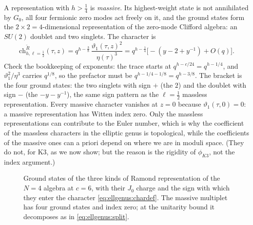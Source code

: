 A representation with $h>\tfrac14$ is \emph{massive}. Its highest-weight state is not
annihilated by $G_0$, all four fermionic zero modes act freely on it, and the ground states
form the $2\times2=4$-dimensional representation of the zero-mode Clifford algebra: an
$SU(2)$ doublet and two singlets. The character is 
\begin{equation}\label{eq:ellgenus:chmassive}
 \mathrm{ch}^{\tilde R}_{h,\ell=\frac12}(\tau,z)=q^{h-\frac38}\,\frac{\vartheta_1(\tau,z)^2}{\eta(\tau)^3}
 =q^{h-\frac14}\Big[-(y-2+y^{-1})+O(q)\Big].
\end{equation}
Check the bookkeeping of exponents: the trace starts at $q^{h-c/24}=q^{h-1/4}$, and
$\vartheta_1^2/\eta^3$ carries $q^{1/8}$, so the prefactor must be $q^{h-1/4-1/8}=q^{h-3/8}$.
The bracket is the four ground states: the two singlets with sign $+$ (the $2$) and the
doublet with sign $-$ (the $-y-y^{-1}$), the same sign pattern as the $\ell=\tfrac12$
massless representation. Every massive character vanishes at $z=0$ because
$\vartheta_1(\tau,0)=0$: a massive representation has Witten index zero. Only the massless
representations can contribute to the Euler number, which is why the coefficient of the
massless characters in the elliptic genus is topological, while the coefficients of the
massive ones can a priori depend on where we are in moduli space. (They do not, for K3, as we
now show; but the reason is the rigidity of $\phi_{K3}$, not the index argument.)

\begin{figure}[htbp]
\centering
{}
\caption{Ground states of the three kinds of Ramond representation of the $N=4$ algebra
at $c=6$, with their $J_0$ charge and the sign with which they enter the character
\eqref{eq:ellgenus:chardef}. The massive multiplet has four ground states and index zero; at
the unitarity bound it decomposes as in \eqref{eq:ellgenus:split}.}
\label{fig:ellgenus:multiplets}
\end{figure}

